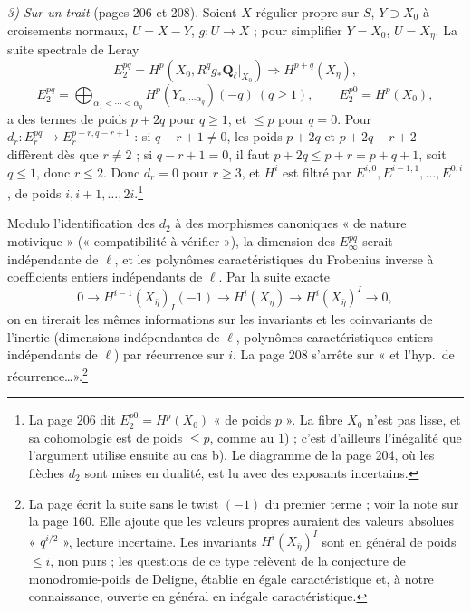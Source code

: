 \documentclass[11pt,a4paper]{article}
\begin{document}
\emph{3) Sur un trait} (pages 206 et 208). Soient $X$ régulier propre sur $S$,
$Y \supset X_0$ à croisements normaux, $U = X - Y$, $g : U \to X$ ; pour
simplifier $Y = X_0$, $U = X_\eta$. La suite spectrale de Leray
\[
  E_2^{pq} = H^p(X_0, R^q g_*\mathbf{Q}_\ell|_{X_0}) \Longrightarrow H^{p+q}(X_\eta),
\]
\[
  E_2^{pq} = \bigoplus_{\alpha_1 < \cdots < \alpha_q} H^p(Y_{\alpha_1 \cdots \alpha_q})(-q)
  \ (q \geq 1), \qquad E_2^{p0} = H^p(X_0),
\]
a des termes de poids $p + 2q$ pour $q \geq 1$, et $\leq p$ pour $q = 0$. Pour
$d_r : E_r^{pq} \to E_r^{p+r, q-r+1}$ : si $q - r + 1 \neq 0$, les poids
$p + 2q$ et $p + 2q - r + 2$ diffèrent dès que $r \neq 2$ ; si $q - r + 1 = 0$, il
faut $p + 2q \leq p + r = p + q + 1$, soit $q \leq 1$, donc $r \leq 2$. Donc
$d_r = 0$ pour $r \geq 3$, et $H^i$ est filtré par $E^{i,0}, E^{i-1,1}, \ldots,
E^{0,i}$, de poids $i, i+1, \ldots, 2i$.\footnote{La page 206 dit $E_2^{p0} =
H^p(X_0)$ « de poids $p$ ». La fibre $X_0$ n'est pas lisse, et sa cohomologie est
de poids $\leq p$, comme au 1) ; c'est d'ailleurs l'inégalité que l'argument
utilise ensuite au cas b). Le diagramme de la page 204, où les flèches $d_2$ sont
mises en dualité, est lu avec des exposants incertains.}

Modulo l'identification des $d_2$ à des morphismes canoniques « de nature
motivique » (« compatibilité à vérifier »), la dimension des
$E_\infty^{pq}$ serait indépendante de $\ell$, et les polynômes caractéristiques
du Frobenius inverse à coefficients entiers indépendants de $\ell$. Par la suite
exacte
\[
  0 \to H^{i-1}(X_{\bar\eta})_I(-1) \to H^i(X_\eta) \to H^i(X_{\bar\eta})^I \to 0,
\]
on en tirerait les mêmes informations sur les invariants et les coinvariants de
l'inertie (dimensions indépendantes de $\ell$, polynômes caractéristiques
entiers indépendants de $\ell$) par récurrence sur $i$. La page 208 s'arrête
sur « et l'hyp.\ de récurrence\ldots ».\footnote{La page écrit la suite sans le
twist $(-1)$ du premier terme ; voir la note sur la page 160. Elle ajoute que
les valeurs propres auraient des valeurs absolues « $q^{i/2}$ », lecture
incertaine. Les invariants $H^i(X_{\bar\eta})^I$ sont en général de poids
$\leq i$, non purs ; les questions de ce type relèvent de la conjecture de
monodromie-poids de Deligne, établie en égale caractéristique et, à notre
connaissance, ouverte en général en inégale caractéristique.}
\end{document}
